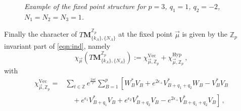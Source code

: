 \documentclass[main.tex]{subfiles}
\begin{document}
\begin{figure}

\caption{\textit{Example of the fixed point structure for $p=3$, $q_{1}=1$, $q_{2}=-2$, $N_1=N_2=N_3=1$.}}
\label{fig:ramifiedeg}
\end{figure}
Finally the character of $T\mathbf{M}_{\{k_A\},\{N_A\}}^{\mathbb{Z}_p}$ at the fixed point $\vec{\mu}$ is given by the $\mathbb{Z}_p$ invariant part of \eqref{eqn:ind}, namely
\begin{equation}
\chi_{\vec{\mu}}\left(T\mathbf{M}_{\{k_A\},\{N_A\}}^{\mathbb{Z}_p}\right):=\chi_{\vec{\mu},\mathbb{Z}_p}^{\text{Vec}}+\chi_{\vec{\mu},\mathbb{Z}_p}^{\text{Hyp}}\,,
\end{equation}
with 
\begin{equation}
\begin{aligned}
\chi_{\vec{\mu},\mathbb{Z}_p}^{\text{Vec}}=&\sum_{t\in\mathbb{Z}}e^{\frac{2\pi t}{r}}
\sum_{B=1}^p\left[W^*_{B}V_B+e^{2\epsilon_+}V^*_{B+q_{1}+q_{2}}W_B-V_{B}^*V_{B}\right.\\
&\left.\quad+e^{\epsilon_1}V_{B+q_{1}}^*V_{B}+e^{\epsilon_2}V_{B+q_{2}}^*V_{B}-e^{2\epsilon_+}V_{B+q_{1}+q_{2}}^*V_{B}\right]\,,
\end{aligned}
\end{equation}
\end{document}
